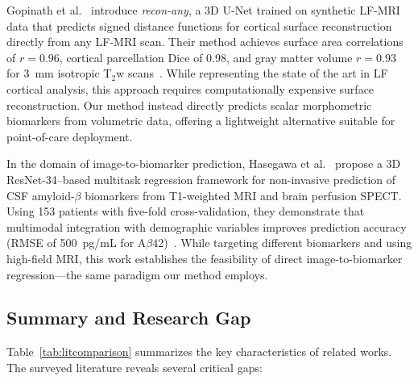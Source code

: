 Gopinath et al.~\cite{gopinath2025reconany} introduce \textit{recon-any}, a 3D U-Net trained on synthetic LF-MRI data that predicts signed distance functions for cortical surface reconstruction directly from any LF-MRI scan. Their method achieves surface area correlations of $r = 0.96$, cortical parcellation Dice of 0.98, and gray matter volume $r = 0.93$ for 3~mm isotropic T$_2$w scans~\cite{gopinath2025reconany}. While representing the state of the art in LF cortical analysis, this approach requires computationally expensive surface reconstruction. Our method instead directly predicts scalar morphometric biomarkers from volumetric data, offering a lightweight alternative suitable for point-of-care deployment.

In the domain of image-to-biomarker prediction, Hasegawa et al.~\cite{hasegawa2025biomarker} propose a 3D ResNet-34--based multitask regression framework for non-invasive prediction of CSF amyloid-$\beta$ biomarkers from T1-weighted MRI and brain perfusion SPECT. Using 153 patients with five-fold cross-validation, they demonstrate that multimodal integration with demographic variables improves prediction accuracy (RMSE of 500~pg/mL for A$\beta$42)~\cite{hasegawa2025biomarker}. While targeting different biomarkers and using high-field MRI, this work establishes the feasibility of direct image-to-biomarker regression---the same paradigm our method employs.

\subsection{Summary and Research Gap}

Table~\ref{tab:litcomparison} summarizes the key characteristics of related works. The surveyed literature reveals several critical gaps:

